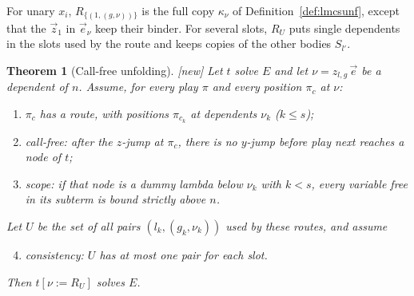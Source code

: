 \documentclass[11pt]{article}
\newcommand{\New}{\textsf{[new]}}
\theoremstyle{plain}
\newtheorem{theorem}{Theorem}[section]
\theoremstyle{definition}
\theoremstyle{remark}
\begin{document}
For unary $x_i$, $R_{\{(1,(g,\nu))\}}$ is the full copy $\kappa_\nu$ of
Definition~\ref{def:lmcsunf}, except that the $\vec z_1$ in $\vec e_\nu$
keep their binder.  For several slots, $R_U$ puts single dependents in
the slots used by the route and keeps copies of the other bodies
$S_{l'}$.

\begin{theorem}[Call-free unfolding]\label{thm:callfree}
\New{} Let $t$ solve $E$ and let $\nu=z_{l,g}\,\vec e$ be a dependent of
$n$.  Assume, for every play $\pi$ and every position $\pi_c$ at $\nu$:
\begin{enumerate}[(C1)]
\item $\pi_c$ has a route, with positions $\pi_{c_k}$ at dependents
  $\nu_k$ ($k\le s$);
\item \emph{call-free}: after the $z$-jump at $\pi_c$, there is no
  $y$-jump before play next reaches a node of $t$;
\item \emph{scope}: if that node is a dummy lambda below $\nu_k$ with
  $k<s$, every variable free in its subterm is bound strictly above $n$.
\end{enumerate}
Let $U$ be the set of all pairs $(l_k,(g_k,\nu_k))$ used by these
routes, and assume
\begin{enumerate}[(C1)]\setcounter{enumi}{3}
\item \emph{consistency}: $U$ has at most one pair for each slot.
\end{enumerate}
Then $t[\nu:=R_U]$ solves $E$.
\end{theorem}
\end{document}
